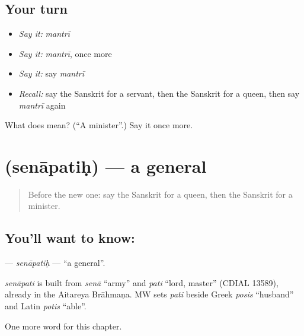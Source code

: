 \subsection*{Your turn}
\begin{itemize}
\raggedright
  \item \emph{Say it:} \emph{mantrī}
  \item \emph{Say it:} \emph{mantrī}, once more
  \item \emph{Say it:} say \emph{mantrī}
  \item \emph{Recall:} say the Sanskrit for a servant, then the Sanskrit for a queen, then say \emph{mantrī} again
\end{itemize}

\begin{tcolorbox}[breakable,colback=teal!4,colframe=teal!35!black,title={Before you move on}]
What does  mean? (\textquotedblleft{}A minister\textquotedblright{}.) Say it once more.
\end{tcolorbox}
\section[\texorpdfstring{\sk{सेनापतिः} (senāpatiḥ)}{सेनापतिः (senāpatiḥ)}]{ (senāpatiḥ) — a general}

\label{lesson:SA-C147-senapatih}



\begin{quote}
Before the new one: say the Sanskrit for a queen, then the Sanskrit for a minister.
\end{quote}

\subsection*{You'll want to know: }
\textbf{} — \emph{senāpatiḥ} — \textquotedblleft{}a general\textquotedblright{}.

\begin{cousinweb}
\emph{senāpati} is built from \emph{senā} \textquotedblleft{}army\textquotedblright{} and \emph{pati} \textquotedblleft{}lord, master\textquotedblright{} (CDIAL 13589), already in the Aitareya Brāhmaṇa. MW sets \emph{pati} beside Greek \emph{posis} \textquotedblleft{}husband\textquotedblright{} and Latin \emph{potis} \textquotedblleft{}able\textquotedblright{}.
\end{cousinweb}

\begin{grammarlens}[title={What you've built}]
One more word for this chapter.
\end{grammarlens}

